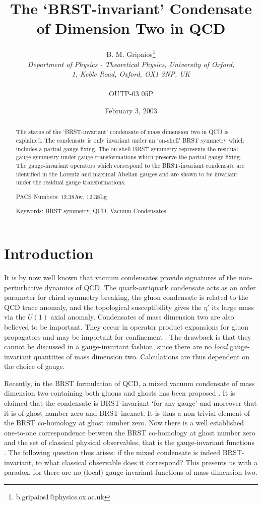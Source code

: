 \documentclass[a4paper,a4paper]{article}
\title{The `BRST-invariant' Condensate of Dimension Two in QCD}
\author{B. M. Gripaios\thanks{b.gripaios1@physics.ox.ac.uk}
\\\emph{Department of Physics - Theoretical Physics, University of Oxford,} 
\\ \emph{1, Keble Road, Oxford, OX1 3NP,  UK}
\\
\\ OUTP-03 05P}
\date{February 3, 2003}
\begin{document}

\maketitle
\begin{abstract}
The status of the `BRST-invariant' condensate of mass dimension two in QCD is explained. The condensate is only invariant under an `on-shell' BRST symmetry which includes a partial gauge fixing. The on-shell BRST symmetry represents the residual gauge symmetry under gauge transformations which preserve the partial gauge fixing. The gauge-invariant operators which correspond to the BRST-invariant condensate are identified in the Lorentz and maximal Abelian gauges and are shown to be invariant under the residual gauge transformations.

PACS Numbers: 12.38Aw, 12.38Lg

Keywords: BRST symmetry, QCD, Vacuum Condensates.
\end{abstract}

\section{Introduction}
It is by now well known that vacuum condensates provide signatures of the non-perturbative dynamics of QCD. The quark-antiquark condensate acts as an order parameter for chiral symmetry breaking, the gluon condensate is related to the QCD trace anomaly, and the topological susceptibility gives the $\eta'$ its large mass via the $U(1)$ axial anomaly. Condensates of mass dimension two are also believed to be important. They occur in operator product expansions for gluon propagators \cite{Lavelle:1988eg,Lavelle:1992yh,Gubarev:1999ie,Boucaud:2000ey,Boucaud:2000nd,Boucaud:2001st,Boucaud:2002nc,Boucaud:2002jt,Kondo:2002cy} and may be important for confinement \cite{Schaden:1999ew,Kondo:2000ey,Gubarev:2000nz,Gubarev:2000eu,Verschelde:2001ia,Dudal:2002aj,Dudal:2002xe}. The drawback is that they cannot be discussed in a gauge-invariant fashion, since there are no \emph{local} gauge-invariant quantities of mass dimension two. Calculations are thus dependent on the choice of gauge.

Recently, in the BRST \cite{Becchi:1975md,Becchi:1976nq,Tyutin:1975qk} formulation of QCD, a mixed vacuum condensate of mass dimension two containing both gluons and ghosts has been proposed \cite{Kondo:2001nq,Kondo:2001tm,Kondo:2002xn}. It is claimed that the condensate is BRST-invariant `for any gauge' and moreover that it is of ghost number zero and BRST-inexact. It is thus a non-trivial element of the BRST co-homology at ghost number zero. Now there is a well established one-to-one correspondence between the BRST co-homology at ghost number zero and the set of classical physical observables, that is the gauge-invariant functions \cite{Henneaux:1992ig}. The following question thus arises: if the mixed condensate is indeed BRST-invariant, to what classical observable does it correspond? This presents us with a paradox, for there are no (local) gauge-invariant functions of mass dimension two.
\end{document}
